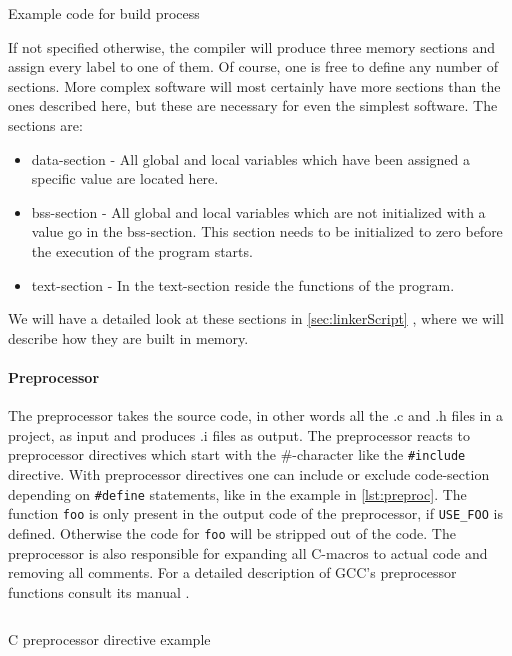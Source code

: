 \documentclass[a4paper,12pt]{article}
\newcommand{\secref}[1]{\autoref{#1} \nameref{#1}}
\newcommand{\inlinec}[1]{\texttt{#1}}
\begin{document}
\begin{listing}
  \inputminted{c}{code/build_example.c}
  \caption{Example code for build process}
  \label{lst:buildCode}
\end{listing}

If not specified otherwise, the compiler will produce three memory sections and assign every label to one of them. Of course, one is free to define any number of sections. More complex software will most certainly have more sections than the ones described here, but these are necessary for even the simplest software. The sections are:

\begin{itemize}
  \item data-section - All global and local variables which have been assigned a specific value are located here.
  \item bss-section - All global and local variables which are not initialized with a value go in the bss-section. This section needs to be initialized to zero before the execution of the program starts.
  \item text-section - In the text-section reside the functions of the program.
\end{itemize}

We will have a detailed look at these sections in \secref{sec:linkerScript}, where we will describe how they are built in memory.

\paragraph{Preprocessor}\label{sec:preProc}
The preprocessor takes the source code, in other words all the .c and .h files in a project, as input and produces .i files as output. The preprocessor reacts to preprocessor directives which start with the \#-character like the \texttt{#include} directive. With preprocessor directives one can include or exclude code-section depending on \texttt{#define} statements, like in the example in \autoref{lst:preproc}. The function \inlinec{foo} is only present in the output code of the preprocessor, if \inlinec{USE_FOO} is defined. Otherwise the code for \inlinec{foo} will be stripped out of the code. The preprocessor is also responsible for expanding all C-macros to actual code and removing all comments. For a detailed description of GCC's preprocessor functions consult its manual \cite{GccGNUOnlneDocsCPreProc}.

\begin{listing}[H]
\inputminted{c}{code/preproc.c}
  \centering
  \caption{C preprocessor directive example}
  \label{lst:preproc}
\end{listing}
\end{document}
